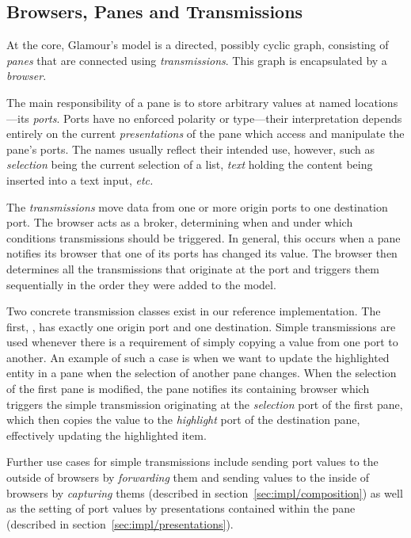 \documentclass[a4paper,10pt,twoside]{book}
\begin{document}
\subsection{Browsers, Panes and Transmissions}
\label{sec:impl/browsers-panes-transmissions}

At the core, Glamour's model is a directed, possibly cyclic graph, consisting of \emph{panes} that are connected using \emph{transmissions}. This graph is encapsulated by a \emph{browser}.

The main responsibility of a pane is to store arbitrary values at named locations---its \emph{ports}. Ports have no enforced polarity or type---their interpretation depends entirely on the current \emph{presentations} of the pane which access and manipulate the pane's ports. The names usually reflect their intended use, however, such as \emph{selection} being the current selection of a list, \emph{text} holding the content being inserted into a text input, \emph{etc.} 

The \emph{transmissions} move data from one or more origin ports to one destination port. The browser acts as a broker, determining when and under which conditions transmissions should be triggered. In general, this occurs when a pane notifies its browser that one of its ports has changed its value. The browser then determines all the transmissions that originate at the port and triggers them sequentially in the order they were added to the model.

Two concrete transmission classes exist in our reference implementation. The first, , has exactly one origin port and one destination. Simple transmissions are used whenever there is a requirement of simply copying a value from one port to another. An example of such a case is when we want to update the highlighted entity in a pane when the selection of another pane changes. When the selection of the first pane is modified, the pane notifies its containing browser which triggers the simple transmission originating at the \emph{selection} port of the first pane, which then copies the value to the \emph{highlight} port of the destination pane, effectively updating the highlighted item.

Further use cases for simple transmissions include sending port values to the outside of browsers by \emph{forwarding} them and sending values to the inside of browsers by \emph{capturing} thems (described in section~\ref{sec:impl/composition}) as well as the setting of port values by presentations contained within the pane (described in section~\ref{sec:impl/presentations}).
\end{document}
